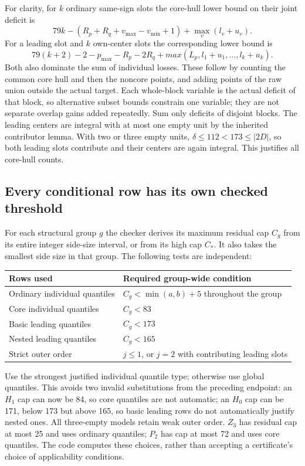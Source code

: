\documentclass[11pt,a4paper]{article}
\begin{document}
For clarity, for $k$ ordinary same-sign slots the core-hull lower bound
on their joint deficit is
\[
 79k-(R_p+R_q+v_{\max}-v_{\min}+1)+\max_v(l_v+u_v).
\]
For a leading slot and $k$ own-center slots the corresponding lower
bound is
\[
 79(k+2)-2-p_{\max}-R_p-2R_q+max(L_p,l_1+u_1,\ldots,l_k+u_k).
\]
Both also dominate the sum of individual losses. These follow by
counting the common core hull and then the noncore points, and adding
points of the raw union outside the actual target. Each whole-block
variable is the actual deficit of that block, so alternative subset
bounds constrain one variable; they are not separate overlap gains
added repeatedly. Sum only deficits of disjoint blocks.
The leading centers are integral with at most one empty unit by the
inherited contributor lemma. With two or three empty units,
$\delta\le112<173\le|2D|$, so both leading slots contribute and their
centers are again integral. This justifies all core-hull counts.

\subsection{Every conditional row has its own checked threshold}
For each structural group $g$ the checker derives its maximum residual
cap $C_g$ from its entire integer side-size interval, or from its high
cap $C_*$. It also takes the smallest side size in that group.
The following tests are independent:
\begin{center}\small
\begin{tabular}{ll}\toprule
Rows used&Required group-wide condition\\\midrule
Ordinary individual quantiles&$C_g<\min(a,b)+5$ throughout the group\\
Core individual quantiles&$C_g<83$\\
Basic leading quantiles&$C_g<173$\\
Nested leading quantiles&$C_g<165$\\
Strict outer order&$j\le1$, or $j=2$ with contributing leading slots\\\bottomrule
\end{tabular}
\end{center}
Use the strongest justified individual quantile type; otherwise use
global quantiles. This avoids two invalid substitutions from the
preceding endpoint: an $H_1$ cap can now be 84, so core quantiles are
not automatic; an $H_0$ cap can be 171, below 173 but above 165, so basic
leading rows do not automatically justify nested ones. All three-empty
models retain weak outer order. $Z_3$ has residual cap at most 25 and
uses ordinary quantiles; $P_2$ has cap at most 72 and uses core quantiles.
The code computes these choices, rather than accepting a certificate's
choice of applicability conditions.
\end{document}
